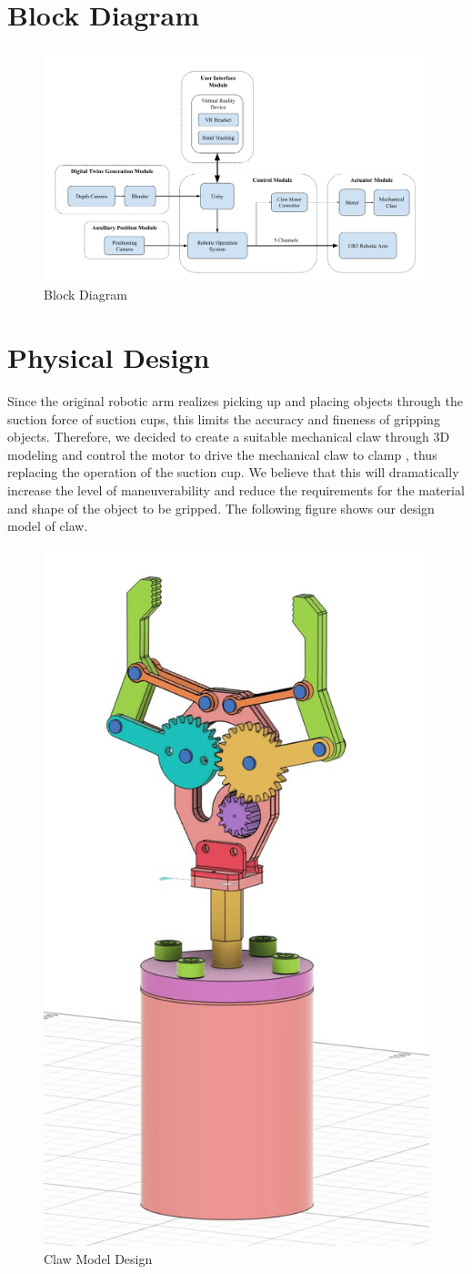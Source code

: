\documentclass{senior-design}
\begin{document}
\section{Block Diagram}
\begin{figure}[H]
    \centering
    \includegraphics[width=1.0\linewidth]{Block Diagram.png}
    \caption{Block Diagram}
\end{figure}
\section{Physical Design}
Since the original robotic arm realizes picking up and placing objects through 
the suction force of suction cups, this limits the accuracy and fineness of 
gripping objects. Therefore, we decided to create a suitable mechanical claw 
through 3D modeling and control the motor to drive the mechanical claw to clamp
, thus replacing the operation of the suction cup. We believe that this will 
dramatically increase the level of maneuverability and reduce the requirements 
for the material and shape of the object to be gripped. The following figure shows
our design model of claw.
\begin{figure}[H]
    \centering
    \includegraphics[width=0.4\linewidth]{Claw.png}
    \caption{Claw Model Design}
\end{figure}
\end{document}
